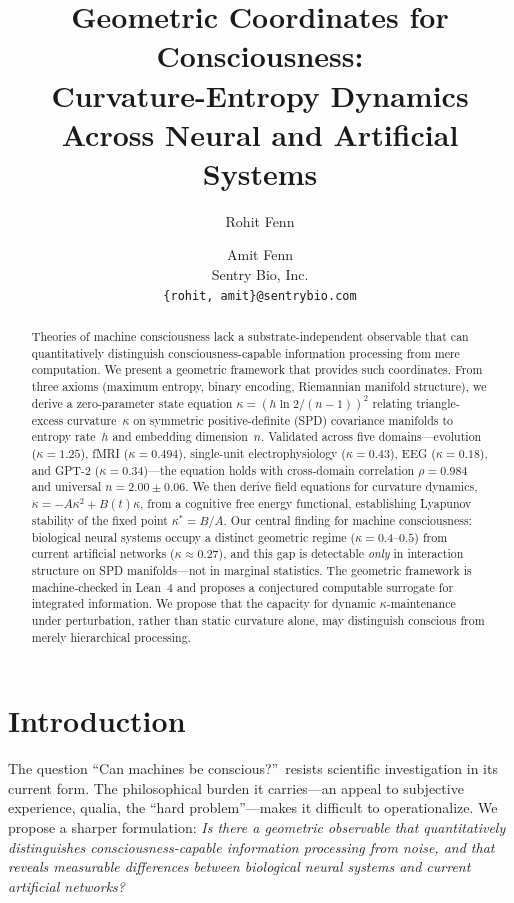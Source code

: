 \documentclass[letterpaper]{article}
\title{Geometric Coordinates for Consciousness:\\
Curvature-Entropy Dynamics Across Neural and Artificial Systems}
\author{
Rohit Fenn \and Amit Fenn \\
Sentry Bio, Inc.\\
\texttt{\{rohit, amit\}@sentrybio.com}
}
\begin{document}
\maketitle

\begin{abstract}
Theories of machine consciousness lack a substrate-independent
observable that can quantitatively distinguish
consciousness-capable information processing from mere
computation.
We present a geometric framework that provides such
coordinates.
From three axioms (maximum entropy, binary encoding,
Riemannian manifold structure), we derive a zero-parameter
state equation
$\kappa = (h\ln 2/(n{-}1))^2$
relating triangle-excess curvature~$\kappa$ on symmetric
positive-definite (SPD) covariance manifolds to entropy
rate~$h$ and embedding dimension~$n$.
Validated across five domains---evolution
($\kappa=1.25$), fMRI ($\kappa=0.494$),
single-unit electrophysiology ($\kappa=0.43$),
EEG ($\kappa=0.18$), and GPT-2 ($\kappa=0.34$)---the
equation holds with cross-domain correlation
$\rho=0.984$ and universal $n=2.00\pm0.06$.
We then derive field equations for curvature dynamics,
$\dot{\kappa}=-A\kappa^2+B(t)\kappa$, from a cognitive
free energy functional, establishing Lyapunov stability
of the fixed point $\kappa^*=B/A$.
Our central finding for machine consciousness:
biological neural systems occupy a distinct geometric
regime ($\kappa=0.4$--$0.5$) from current artificial
networks ($\kappa\approx0.27$), and this gap is detectable
\emph{only} in interaction structure on SPD
manifolds---not in marginal statistics.
The geometric framework is machine-checked in Lean~4
and proposes a conjectured computable surrogate for
integrated information.
We propose that the capacity for dynamic
$\kappa$-maintenance under perturbation, rather than
static curvature alone, may distinguish conscious from
merely hierarchical processing.
\end{abstract}

\section{Introduction}

The question ``Can machines be conscious?''\ resists
scientific investigation in its current form.
The philosophical burden it carries---an appeal to
subjective experience, qualia, the ``hard
problem''---makes it difficult to operationalize.
We propose a sharper formulation:
\emph{Is there a geometric observable that
quantitatively distinguishes consciousness-capable
information processing from noise, and that reveals
measurable differences between biological neural
systems and current artificial networks?}
\end{document}
